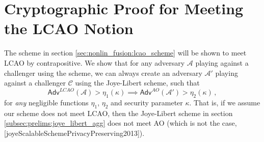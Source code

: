\chapter{Cryptographic Proof for Meeting the LCAO Notion}\label{app:lca_scheme_proof}
The scheme in section \ref{sec:nonlin_fusion:lcao_scheme} will be shown to meet LCAO by contrapositive. We show that for any adversary $\mathcal{A}$ playing against a challenger using the scheme, we can always create an adversary $\mathcal{A}'$ playing against a challenger $\mathcal{C}$ using the Joye-Libert scheme, such that
\begin{equation*}
    \mathsf{Adv}^{LCAO}(\mathcal{A}) > \eta_1(\kappa) \implies \mathsf{Adv}^{AO}(\mathcal{A}') > \eta_2(\kappa)\,,
\end{equation*}
for \textit{any} negligible functions $\eta_1$, $\eta_2$ and security parameter $\kappa$. That is, if we assume our scheme does not meet LCAO, then the Joye-Libert scheme in section \ref{subsec:prelims:joye_libert_agg} does not meet AO (which is not the case, [joyeScalableSchemePrivacyPreserving2013]).
